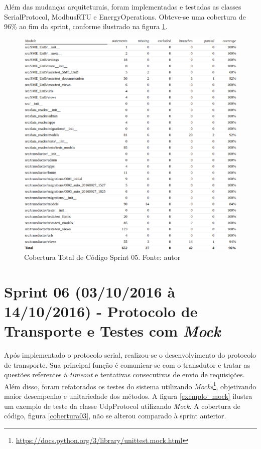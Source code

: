 Além das mudanças arquiteturais, foram implementadas e testadas as classes SerialProtocol, ModbusRTU e EnergyOperations. Obteve-se uma cobertura de 96\% ao fim da sprint, conforme ilustrado na figura \ref{cobertura02}.
\begin{figure}[!htpb]
    \centering
    \includegraphics[keepaspectratio=true,scale=0.6]{figuras/cobertura02.eps}
    \caption{Cobertura Total de Código Sprint 05. Fonte: autor}
    \label{cobertura02}
\end{figure}

\section{Sprint 06 (03/10/2016 à 14/10/2016) - Protocolo de Transporte e Testes com \textit{Mock}}
Após implementado o protocolo serial, realizou-se o desenvolvimento do protocolo de transporte. Sua principal função é comunicar-se com o transdutor e tratar as questões referentes à \textit{timeout} e tentativas consecutivas de envio de requisições. Além disso, foram refatorados os testes do sistema utilizando \textit{Mocks}\footnote{\url{https://docs.python.org/3/library/unittest.mock.html}}, objetivando maior desempenho e unitariedade dos métodos. A figura \ref{exemplo_mock} ilustra um exemplo de teste da classe UdpProtocol utilizando \textit{Mock}. A cobertura de código, figura \ref{cobertura03}, não se alterou comparado à sprint anterior.

